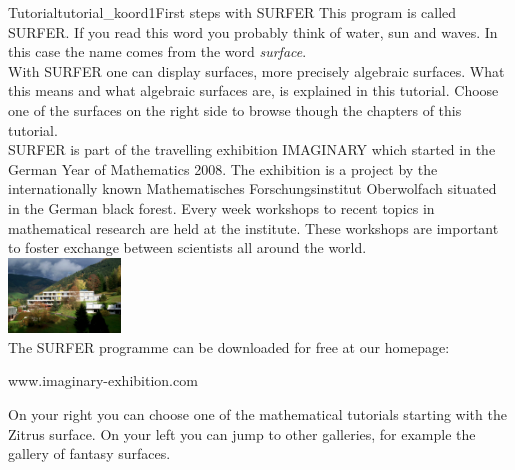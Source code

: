 \begin{surferIntroPage}{Tutorial}{tutorial_koord1}{First steps with SURFER}
This program is called SURFER. If you read this word you probably think of water, sun and waves. In this case the name comes from the word {\it surface}.
\\
With SURFER one can display surfaces, more precisely algebraic surfaces. What this means and what algebraic surfaces are, is explained in this tutorial. Choose one of the surfaces on the right side to browse though the chapters of this tutorial.\\
SURFER is part of the travelling exhibition IMAGINARY which started in the German Year of Mathematics 2008. The exhibition is a project by the internationally known Mathematisches Forschungsinstitut Oberwolfach situated in the German black forest. Every week workshops to recent topics in mathematical research are held at the institute. These workshops are important to foster exchange between scientists all around the world. \\
\vspace{0.2cm} \hspace{3.5cm}\includegraphics[width=3cm]{./../../common/images/photo_mfo.jpg}\\
The SURFER programme can be downloaded for free at our homepage: \\
\begin{centering}
www.imaginary-exhibition.com\\
\end{centering}
 \vspace{0.2cm}
On your right you can choose one of the mathematical tutorials starting with the Zitrus surface. On your left you can jump to other galleries, for example the gallery of fantasy surfaces.
\end{surferIntroPage}
